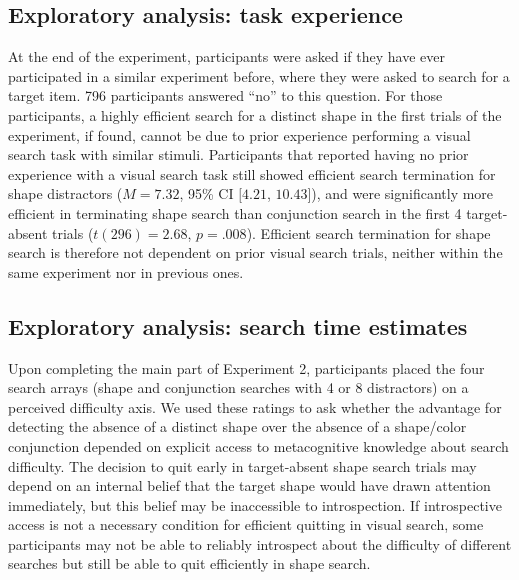 \documentclass[
  english,
  man]{apa6}
\begin{document}
\hypertarget{exploratory-analysis-task-experience}{%
\subsection{Exploratory analysis: task experience}\label{exploratory-analysis-task-experience}}

At the end of the experiment, participants were asked if they have ever participated in a similar experiment before, where they were asked to search for a target item. 796 participants answered \enquote{no} to this question. For those participants, a highly efficient search for a distinct shape in the first trials of the experiment, if found, cannot be due to prior experience performing a visual search task with similar stimuli. Participants that reported having no prior experience with a visual search task still showed efficient search termination for shape distractors (\(M = 7.32\), 95\% CI \([4.21\), \(10.43]\)), and were significantly more efficient in terminating shape search than conjunction search in the first 4 target-absent trials (\(t(296) = 2.68\), \(p = .008\)). Efficient search termination for shape search is therefore not dependent on prior visual search trials, neither within the same experiment nor in previous ones.

\hypertarget{exploratory-analysis-search-time-estimates}{%
\subsection{Exploratory analysis: search time estimates}\label{exploratory-analysis-search-time-estimates}}

Upon completing the main part of Experiment 2, participants placed the four search arrays (shape and conjunction searches with 4 or 8 distractors) on a perceived difficulty axis. We used these ratings to ask whether the advantage for detecting the absence of a distinct shape over the absence of a shape/color conjunction depended on explicit access to metacognitive knowledge about search difficulty. The decision to quit early in target-absent shape search trials may depend on an internal belief that the target shape would have drawn attention immediately, but this belief may be inaccessible to introspection. If introspective access is not a necessary condition for efficient quitting in visual search, some participants may not be able to reliably introspect about the difficulty of different searches but still be able to quit efficiently in shape search.
\end{document}
